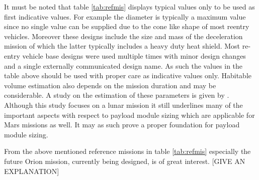 It must be noted that table \ref{tab:refmis} displays typical values only to be used as first indicative values. For example the diameter is typically a maximum value since no single value can be supplied due to the cone like shape of most reentry vehicles. Moreover these designs include the size and mass of the deceleration mission of which the latter typically includes a heavy duty heat shield. Most re-entry vehicle base designs were used multiple times with minor design changes and a single externally communicated design name. As such the values in the table above should be used with proper care as indicative values only. Habitable volume estimation also depends on the mission duration and may be considerable. A study on the estimation of these parameters is given by \cite{Rudisill}. Although this study focuses on a lunar mission it still underlines many of the important aspects with respect to payload module sizing which are applicable for Mars missions as well. It may as such prove a proper foundation for payload module sizing. 

From the above mentioned reference missions in table \ref{tab:refmis} especially the future Orion mission, currently being designed, is of great interest.  [GIVE AN EXPLANATION]